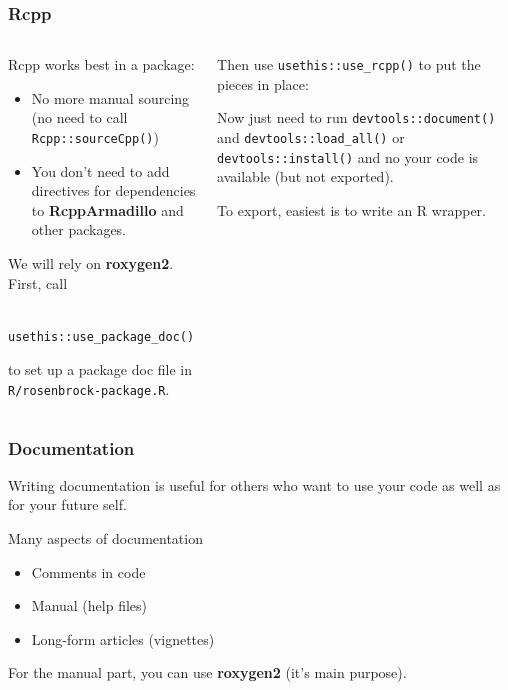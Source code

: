 \documentclass[aspectratio=1610,onlytextwidth]{beamer}
\begin{document}
\begin{frame}[c,fragile]
  \frametitle{Rcpp}

  \begin{columns}[T]
    \begin{column}{0.48\textwidth}

      Rcpp works best in a package:
      \begin{itemize}
        \item No more manual sourcing (no need to call \lstinline{Rcpp::sourceCpp()})
        \item You don't need to add directives for dependencies to \textbf{RcppArmadillo} and other
              packages.
      \end{itemize}

      \pause\medskip

      We will rely on \textbf{roxygen2}. First, call
      \begin{lstlisting}
        usethis::use_package_doc()
      \end{lstlisting}
      to set up a package doc file in \texttt{R/rosenbrock-package.R}.
    \end{column}

    \pause

    \begin{column}{0.42\textwidth}
      Then use \lstinline{usethis::use_rcpp()} to put the pieces in place:

      \medskip


      \medskip\pause

      Now just need to run \texttt{devtools::document()} and
      \lstinline{devtools::load_all()} or \lstinline{devtools::install()}
      and no your code is available (but not exported).

      \medskip\pause

      To export, easiest is to write an R wrapper.
    \end{column}
  \end{columns}

\end{frame}

\begin{frame}[c]
  \frametitle{Documentation}

  Writing documentation is useful for others who want to use your code as well as for your future self.

  \medskip\pause

  Many aspects of documentation
  \begin{itemize}
    \item Comments in code
    \item Manual (help files)
    \item Long-form articles (vignettes)
  \end{itemize}

  \medskip\pause

  For the manual part, you can use \textbf{roxygen2} (it's main purpose).

\end{frame}
\end{document}
